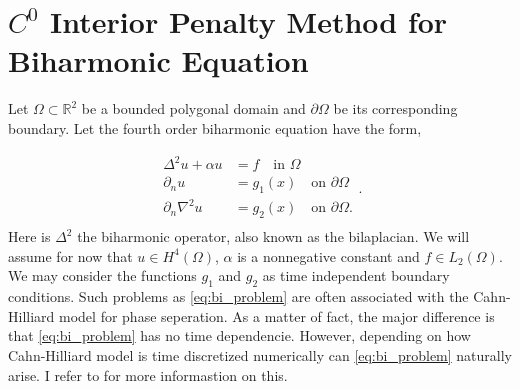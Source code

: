 \newpage
\section{ $C^0$ Interior Penalty Method for Biharmonic Equation}
\label{sec:ch1}



Let $\Omega \subset   \mathbb{R} ^2$ be a bounded polygonal domain and $\partial \Omega $ be its corresponding boundary. Let the fourth order biharmonic equation have the form,

\begin{equation}
\label{eq:bi_problem}
\begin{split}
    \Delta^2  u  + \alpha  u  & = f \quad \text{in } \Omega   \\
    \partial _{n} u & = g_1\left( x \right)  \quad \text{on } \partial \Omega  \\
    \partial _{n} \nabla ^2 u & = g_{2}\left( x \right)  \quad \text{on } \partial \Omega .  \\
\end{split}
.\end{equation}
Here is $\Delta ^2$ the biharmonic operator, also known as the bilaplacian. We will assume for now that $u \in H^{4}\left( \Omega  \right) $, $\alpha $ is a nonnegative constant and $f \in L_{2}\left( \Omega  \right) $. We may consider the functions $g_{1}$ and $g_{2}$ as time independent boundary conditions. Such problems as \eqref{eq:bi_problem} are often associated with the Cahn-Hilliard model
\cite{cahnhilliard1957} for phase seperation. As a matter of fact, the major difference is that \eqref{eq:bi_problem}
has no time dependencie. However, depending on how Cahn-Hilliard model is time discretized numerically can
\eqref{eq:bi_problem} naturally arise. I refer to \cite{brenner2012quadratic} for more informastion on this.

